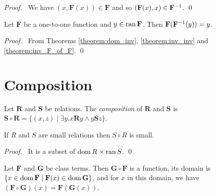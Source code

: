 \begin{proof}
    \pf\ We have $(x, \mathbf{F}(x)) \in \mathbf{F}$ and so 
    $(\mathbf{F}(x), x) \in {\mathbf{F}}^{-1}$. \qed
\end{proof}

\begin{theorem}[Pairing]
    Let $\mathbf{F}$ be a one-to-one function and $y \in \operatorname{ran} \mathbf{F}$.
    Then $\mathbf{F}({\mathbf{F}}^{-1}(y)) = y$.
\end{theorem}

\begin{proof}
    \pf\ From Theorems \ref{theorem:dom_inv}, \ref{theorem:inv_inv} and \ref{theorem:inv_F_of_F}. \qed
\end{proof}

\section{Composition}

\begin{definition}
    Let $\mathbf{R}$ and $\mathbf{S}$ be relations. 
    The \emph{composition} of $\mathbf{R}$ and $\mathbf{S}$ is
    $\mathbf{S} \circ \mathbf{R} = \{ (x,z) \mid \exists y. x \mathbf{R} y \wedge y \mathbf{S} z \}$.
\end{definition}

\begin{theorem}
    If $R$ and $S$ are small relations then $S \circ R$ is small.
\end{theorem}

\begin{proof}
    \pf\ It is a subset of $\operatorname{dom} R \times \operatorname{ran} S$. \qed
\end{proof}

\begin{theorem}[Pairing]
    \label{theorem:comp_function}
    Let $\mathbf{F}$ and $\mathbf{G}$ be class terms. Then $\mathbf{G} \circ \mathbf{F}$ is a function, its domain
    is $\{ x \in \operatorname{dom} \mathbf{F} \mid \mathbf{F}(x) \in \operatorname{dom} \mathbf{G} \}$, and for $x$ in this domain,
    we have $(\mathbf{F} \circ \mathbf{G})(x) = \mathbf{F}(\mathbf{G}(x))$.
\end{theorem}


